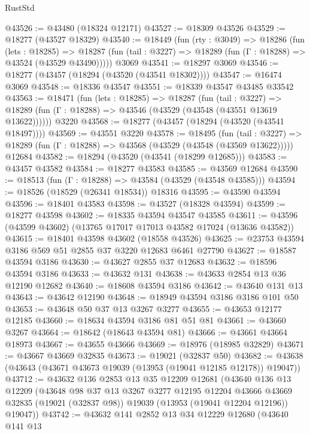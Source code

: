 \begin{lexlean}{RustStd}
\begin{coremodule}
@43526 := @43480 (@18324 @12171)
@43527 := @18309 @43526
@43529 := @18277 (@43527 @18329)
@43540 := @18449
    (fun (rty : @3049) =>
    @18286
      (fun (lets : @18285) =>
      @18287 (fun (tail : @3227) => @18289 (fun (Γ : @18288) => @43524 (@43529 @43490)))))
    @3069
@43541 := @18297 @3069
@43546 := @18277 (@43457 (@18294 (@43520 (@43541 @18302))))
@43547 := @16474 @3069
@43548 := @18336 @43547
@43551 := @18339 @43547 @43485 @33542
@43563 := @18471
    (fun (lets : @18285) =>
    @18287
      (fun (tail : @3227) =>
      @18289 (fun (Γ : @18288) => @43546 (@43529 (@43548 (@43551 @13619 @13622))))))
    @3220
@43568 := @18277 (@43457 (@18294 (@43520 (@43541 @18497))))
@43569 := @43551 @3220
@43578 := @18495
    (fun (tail : @3227) => @18289 (fun (Γ : @18288) => @43568 (@43529 (@43548 (@43569 @13622)))))
    @12684
@43582 := @18294 (@43520 (@43541 (@18299 @12685)))
@43583 := @43457 @43582
@43584 := @18277 @43583
@43585 := @43569 @12684
@43590 := @18513 (fun (Γ : @18288) => @43584 (@43529 (@43548 @43585)))
@43594 := @18526 (@18529 (@26341 @18534)) @18316
@43595 := @43590 @43594
@43596 := @18401 @43583
@43598 := @43527 (@18328 @43594)
@43599 := @18277 @43598
@43602 := @18335 @43594 @43547 @43585
@43611 := @43596 (@43599 @43602) (@13765 @17017 @17013 @43582 @17024 (@13636 @43582))
@43615 := @18401 @43598 @43602 (@18558 @43526)
@43625 := @23753 @43594 @3186 @569 @51 @2855 @37 @3220 @12683 @6461 @27790
@43627 := @18587 @43594 @3186
@43630 := @43627 @2855 @37 @12683
@43632 := @18596 @43594 @3186
@43633 := @43632 @131
@43638 := @43633 @2854 @13 @36 @12190 @12682
@43640 := @18608 @43594 @3186
@43642 := @43640 @131 @13
@43643 := @43642 @12190
@43648 := @18949 @43594 @3186 @3186 @101 @50
@43653 := @43648 @50 @37 @13 @3267 @3277
@43655 := @43653 @12177 @12185
@43660 := @18634 @43594 @3186 @81 @51 @81
@43661 := @43660 @3267
@43664 := @18642 (@18643 @43594 @81)
@43666 := @43661 @43664 @18973
@43667 := @43655 @43666
@43669 := @18976 (@18985 @32829)
@43671 := @43667 @43669 @32835
@43673 := @19021 (@32837 @50)
@43682 := @43638 (@43643 (@43671 @43673 @19039 (@13953 (@19041 @12185 @12178)) @19047))
@43712 := @43632
    @136
    @2853
    @13
    @35
    @12209
    @12681
    (@43640
      @136
      @13
      @12209
      (@43648
        @98
        @37
        @13
        @3267
        @3277
        @12195
        @12204
        @43666
        @43669
        @32835
        (@19021 (@32837 @98))
        @19039
        (@13953 (@19041 @12204 @12196))
        @19047))
@43742 := @43632
    @141
    @2852
    @13
    @34
    @12229
    @12680
    (@43640
      @141
      @13

\end{coremodule}
\end{lexlean}
